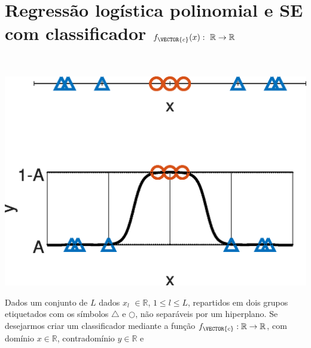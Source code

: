 \newpage

\section{Regressão logística polinomial e SE com classificador $f_{\VECTOR{c}}(x):~\mathbb{R} \rightarrow \mathbb{R}$}
\label{sec:theo:reglogr1r1poly:1}




\begin{theorem}\label{theo:reglogr1r1poly:1}
~\\
\noindent
\begin{minipage}{0.45\textwidth}
\centering
\includegraphics[width=0.95\linewidth]{chapters/classificacao/mfiles/reglogr1r1poly/reglogr1r1poly.eps} 
\end{minipage}
\begin{minipage}{0.55\textwidth}
Dados um conjunto de $L$ dados 
$x_l$ $\in \mathbb{R}$, $1\leq l\leq L$,
repartidos em dois grupos etiquetados com os símbolos $\bigtriangleup$ e $\bigcirc$,
não separáveis por um hiperplano.
Se desejarmos criar um classificador mediante 
a função  $f_{\VECTOR{c}}:\mathbb{R} \rightarrow \mathbb{R}$,
com domínio $x \in \mathbb{R}$, contradomínio $y \in \mathbb{R}$ e 

\end{minipage}
\end{theorem}
